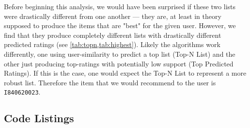 Before beginning this analysis, we would have been surprised if these two lists were drastically different from one another --- they are, at least in theory supposed to produce the items that are "best" for the given user.  However, we find that they produce completely different lists with drastically different predicted ratings (see \cref{tab:topn,tab:highest}).  Likely the algorithms work differently, one using user-similarity to predict a top list (Top-N List) and the other just producing top-ratings with potentially low support (Top Predicted Ratings).  If this is the case, one would expect the Top-N List to represent a more robust list.  Therefore the item that we would recommend to the user is \texttt{I840620023}.




\begin{appendices}

\clearpage
\section{Code Listings}


\end{appendices}



% 



